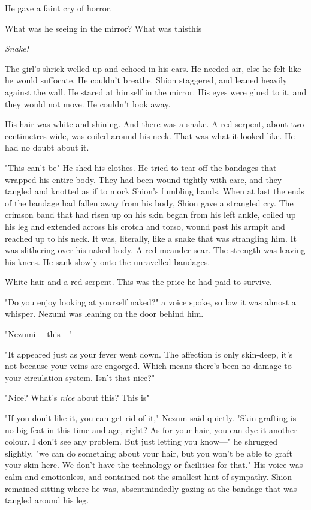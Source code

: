 He gave a faint cry of horror.

What was he seeing in the mirror? What was this\el this\el 

\emph{Snake!}

The girl's shriek welled up and echoed in his ears. He needed air, else
he felt like he would suffocate. He couldn't breathe. Shion staggered,
and leaned heavily against the wall. He stared at himself in the mirror.
His eyes were glued to it, and they would not move. He couldn't look
away.

His hair was white and shining. And there was a snake. A red serpent,
about two centimetres wide, was coiled around his neck. That was what it
looked like. He had no doubt about it.

"This can't be\el " He shed his clothes. He tried to tear off the
bandages that wrapped his entire body. They had been wound tightly with
care, and they tangled and knotted as if to mock Shion's fumbling hands.
When at last the ends of the bandage had fallen away from his body,
Shion gave a strangled cry. The crimson band that had risen up on his
skin began from his left ankle, coiled up his leg and extended across
his crotch and torso, wound past his armpit and reached up to his neck.
It was, literally, like a snake that was strangling him. It was
slithering over his naked body. A red meander scar. The strength was
leaving his knees. He sank slowly onto the unravelled bandages.

White hair and a red serpent. This was the price he had paid to survive.

"Do you enjoy looking at yourself naked?" a voice spoke, so low it was
almost a whisper. Nezumi was leaning on the door behind him.

"Nezumi--- this---"

"It appeared just as your fever went down. The affection is only
skin-deep, it's not because your veins are engorged. Which means there's
been no damage to your circulation system. Isn't that nice?"

"Nice? What's \emph{nice} about this? This is\el "

"If you don't like it, you can get rid of it," Nezum said quietly. "Skin
grafting is no big feat in this time and age, right? As for your hair,
you can dye it another colour. I don't see any problem. But just letting
you know---" he shrugged slightly, "we can do something about your hair,
but you won't be able to graft your skin here. We don't have the
technology or facilities for that." His voice was calm and emotionless,
and contained not the smallest hint of sympathy. Shion remained sitting
where he was, absentmindedly gazing at the bandage that was tangled
around his leg.

